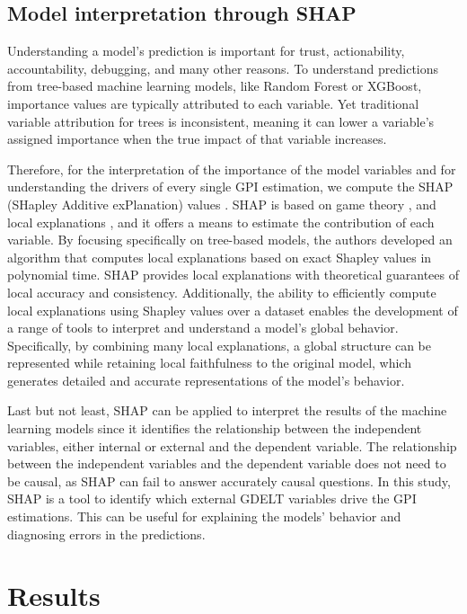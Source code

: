\documentclass{bmcart}
\begin{document}
\subsection{Model interpretation through SHAP}
Understanding a model's prediction is important for trust, actionability, accountability, debugging, and many other reasons. To understand predictions from tree-based machine learning models, like Random Forest or XGBoost, importance values are typically attributed to each variable. Yet traditional variable attribution for trees is inconsistent, meaning it can lower a variable's assigned importance when the true impact of that variable increases. 

Therefore, for the interpretation of the importance of the model variables and for understanding the drivers of every single GPI estimation, we compute the SHAP (SHapley Additive exPlanation) values \cite{lundberg2018consistent,lundberg2017unified}. 
SHAP is based on game theory \cite{vstrumbelj2014explaining}, and local explanations \cite{ribeiro2016should}, and it offers a means to estimate the contribution of each variable. 
By focusing specifically on tree-based models, the authors developed an algorithm that computes local explanations based on exact Shapley values in polynomial time. SHAP provides local explanations with theoretical guarantees of local accuracy and consistency. Additionally, the ability to efficiently compute local explanations using Shapley values over a dataset enables the development of a range of tools to interpret and understand a model's global behavior. 
Specifically, by combining many local explanations, a global structure can be represented while retaining local faithfulness \cite{ribeiro2018anchors} to the original model, which generates detailed and accurate representations of the model's behavior.  

Last but not least, SHAP can be applied to interpret the results of the machine learning models since it identifies the relationship between the independent variables, either internal or external and the dependent variable. 
The relationship between the independent variables and the dependent variable does not need to be causal, as SHAP can fail to  answer accurately causal questions. In this study, SHAP is a tool to identify which external GDELT variables drive the GPI estimations. 
This can be useful for explaining the models' behavior and diagnosing errors in the predictions.

\section{Results}
\label{Results}
\end{document}

